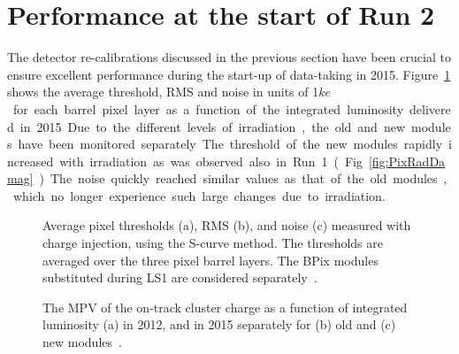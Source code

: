 
\section{Performance at the start of Run 2}\label{sec:BPixPerf2015}

The detector re-calibrations discussed in the previous section have been crucial to ensure excellent performance during the start-up of data-taking in 2015.
Figure~\ref{fig:ThrVsLumi2015} shows the average threshold, RMS and noise in units of 1\unit{$ke$} for each barrel pixel layer as a function of the integrated luminosity delivered in 2015.
Due to the different levels of irradiation, the old and new modules have been monitored separately.
The threshold of the new modules rapidly increased with irradiation as was observed also in Run~1 (Fig.~\ref{fig:PixRadDamag}).
The noise quickly reached similar values as that of the old modules, which no longer experience such large changes due to irradiation.

\begin{figure}[!htb]
 \begin{center}
 \end{center}
 \caption{Average pixel thresholds (a), RMS (b), and noise (c) measured with charge injection, using the S-curve method. The thresholds are averaged over the three pixel barrel layers. The BPix modules substituted during LS1 are considered separately~\cite{PixelOffline}.}
 \label{fig:ThrVsLumi2015}
\end{figure}

\begin{figure}[!htb]
 \begin{center}
 \end{center}
 \caption{The MPV of the on-track cluster charge as a function of integrated luminosity (a) in 2012, and in 2015 separately for (b) old and (c) new modules~\cite{PixelOffline}.}
 \label{fig:ClusterChargeVsLumi}
\end{figure}

